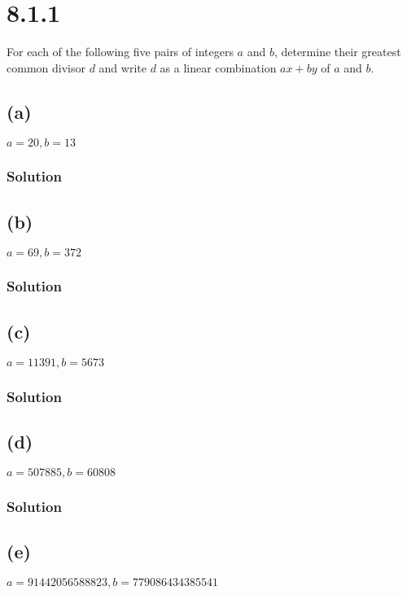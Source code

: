 \documentclass[fleqn]{article}
\begin{document}
    
    \section{8.1.1}
    For each of the following five pairs of integers $a$ and $b$, determine their greatest common divisor $d$ and write $d$ as a linear combination $ax + by$ of $a$ and $b$.
        
        \subsection{(a)}
        $a = 20, b = 13$
            
            \subsubsection{Solution}
            
        
        \subsection{(b)}
        $a = 69, b = 372$
            
            \subsubsection{Solution}
            
        
        \subsection{(c)}
        $a = 11391, b = 5673$
            
            \subsubsection{Solution}
            
        
        \subsection{(d)}
        $a = 507885, b = 60808$
            
            \subsubsection{Solution}
            
        
        \subsection{(e)}
        $a = 91442056588823, b = 779086434385541$
            
\end{document}
